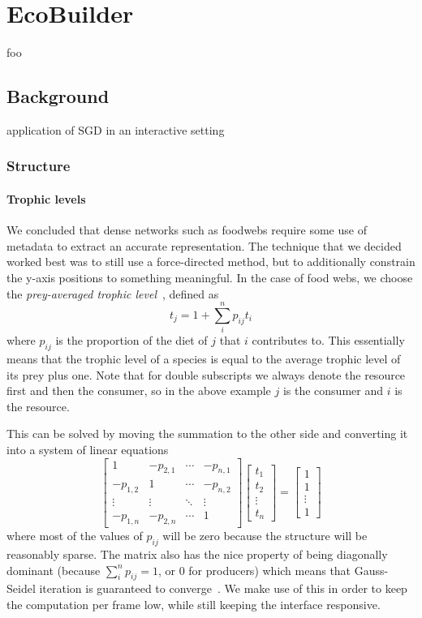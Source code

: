\chapter{EcoBuilder}
foo
\label{chap:joy}

\section{Background}
application of SGD in an interactive setting

\subsection{Structure}
\subsubsection{Trophic levels}
We concluded that dense networks such as foodwebs require some use of metadata to extract an accurate representation.
The technique that we decided worked best was to still use a force-directed method, but to additionally constrain the y-axis positions to something meaningful. In the case of food webs, we choose the
\emph{prey-averaged trophic level}~\cite{trophic}, defined as
\begin{equation}
  t_j = 1 + \sum_i^n p_{ij}t_i
\end{equation}
where $p_{ij}$ is the proportion of the diet of $j$ that $i$ contributes to. This essentially means that the trophic level of a species is equal to the average trophic level of its prey plus one.
Note that for double subscripts we always denote the resource first and then the consumer, so in the above example $j$ is the consumer and $i$ is the resource.

This can be solved by moving the summation to the other side and converting it into a system of linear equations
\begin{equation}
    \begin{bmatrix}
    1&-p_{2,1}&\cdots&-p_{n,1}\\
    -p_{1,2}&1&\cdots&-p_{n,2}\\
    \vdots&\vdots&\ddots&\vdots\\
    -p_{1,n}&-p_{2,n}&\cdots&1
    \end{bmatrix}
    \begin{bmatrix}
    t_1\\t_2\\\vdots\\t_n
    \end{bmatrix}
    =
    \begin{bmatrix}
    1\\1\\\vdots\\1
    \end{bmatrix}
\end{equation}
where most of the values of $p_{ij}$ will be zero because the structure will be reasonably sparse.
The matrix also has the nice property of being diagonally dominant (because $\sum_i^np_{ij} = 1$, or $0$ for producers) which means that Gauss-Seidel iteration is guaranteed to converge~\cite{gaussseidel}. We make use of this in order to keep the computation per frame low, while still keeping the interface responsive.

